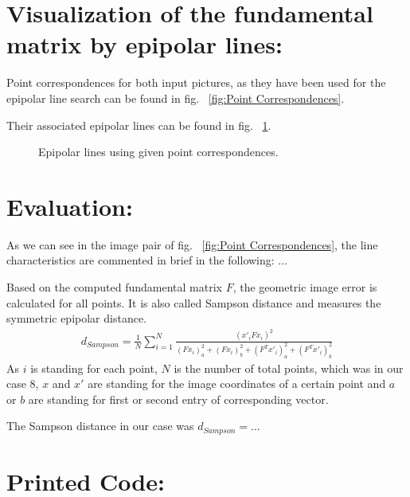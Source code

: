 \documentclass[a4paper,headings=small]{scrartcl}
\numberwithin{equation}{section} %
\numberwithin{figure}{section}   %
\newcommand{\generatedImgRootTarget}{../../../target}
\begin{document}
\section{Visualization of the fundamental matrix by epipolar lines:}

Point correspondences for both input pictures, 
as they have been used for the epipolar line search 
can be found in fig. ~\ref{fig:Point Correspondences}.

Their associated epipolar lines can be found in fig. ~\ref{fig:Epipolar Lines}.
\begin{figure}
   \hfill
  \caption{Epipolar lines using given point correspondences.}
  \label{fig:Epipolar Lines}
\end{figure}
\section{Evaluation:}
As we can see in the image pair of fig. ~\ref{fig:Point Correspondences},
the line characteristics are commented in brief in the following:
...

Based on the computed fundamental matrix $F$, the geometric image error
is calculated for all points. It is also called Sampson distance
and measures the symmetric epipolar distance.
\begin{align}
  d_{Sampson} = \frac{1}{N} \sum_{i=1}^N \frac{(x'_i F x_i)^2}{(F x_i)_a^2 + (F x_i)_b^2 + (F^T x'_i)_a^2 + (F^T x'_i)_b^2}
\end{align}
As $i$ is standing for each point, $N$ is the number of total points, 
which was in our case 8, $x$ and $x'$ are standing for the image coordinates of a certain
point and $a$ or $b$ are standing for first or second entry of corresponding vector.

The Sampson distance in our case was $d_{Sampson}=...$
\section{Printed Code:}


\end{document}
